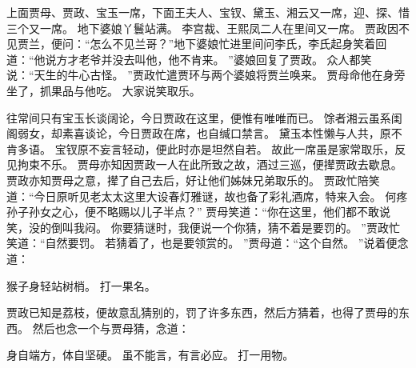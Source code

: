 上面贾母、贾政、宝玉一席，下面王夫人、宝钗、黛玉、湘云又一席，迎、探、惜三个又一席。
地下婆娘丫鬟站满。
李宫裁、王熙凤二人在里间又一席。
贾政因不见贾兰，便问：“怎么不见兰哥？”地下婆娘忙进里间问李氏，李氏起身笑着回道：“他说方才老爷并没去叫他，他不肯来。
”婆娘回复了贾政。
众人都笑说：“天生的牛心古怪。
”贾政忙遣贾环与两个婆娘将贾兰唤来。
贾母命他在身旁坐了，抓果品与他吃。
大家说笑取乐。
\par
往常间只有宝玉长谈阔论，今日贾政在这里，便惟有唯唯而已。
馀者湘云虽系闺阁弱女，却素喜谈论，今日贾政在席，也自缄口禁言。
黛玉本性懒与人共，原不肯多语。
宝钗原不妄言轻动，便此时亦是坦然自若。
故此一席虽是家常取乐，反见拘束不乐。
贾母亦知因贾政一人在此所致之故，酒过三巡，便撵贾政去歇息。
贾政亦知贾母之意，撵了自己去后，好让他们姊妹兄弟取乐的。
贾政忙陪笑道：“今日原听见老太太这里大设春灯雅谜，故也备了彩礼酒席，特来入会。
何疼孙子孙女之心，便不略赐以儿子半点？”
贾母笑道：“你在这里，他们都不敢说笑，没的倒叫我闷。
你要猜谜时，我便说一个你猜，猜不着是要罚的。
”贾政忙笑道：“自然要罚。
若猜着了，也是要领赏的。
”贾母道：“这个自然。
”说着便念道：\par
\hop
猴子身轻站树梢。
打一果名。
\par
{}\par
\hop
贾政已知是荔枝，便故意乱猜别的，罚了许多东西，然后方猜着，也得了贾母的东西。
然后也念一个与贾母猜，念道：\par
\hop
身自端方，体自坚硬。
虽不能言，有言必应。
打一用物。
\par
{}\par
